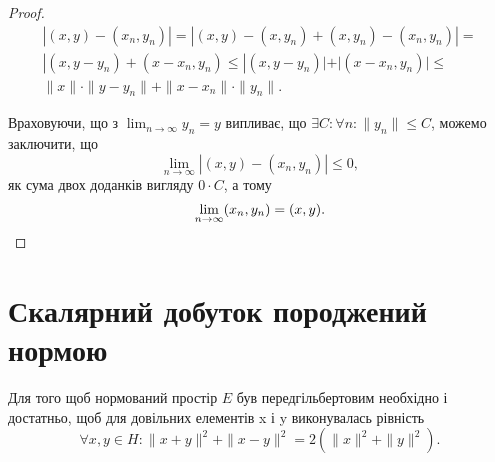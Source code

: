 \begin{proof}
\begin{multline*}
    |(x, y) - (x_n, y_n)| =
    |(x, y) - (x, y_n) + (x, y_n) - (x_n, y_n)| =  \\
    |(x, y - y_n) + (x - x_n, y_n) \le
    |(x, y - y_n)| + |(x - x_n, y_n)| \le \\
    \|x\| \cdot \|y - y_n\| + \|x - x_n\| \cdot \|y_n\|.
\end{multline*}

Враховуючи, що з $\lim_{n \to \infty} y_n = y$ випливає, що 
$\exists C: \forall n: \|y_n\| \le C$, можемо заключити, що
\begin{equation*}
    \lim_{n \to \infty}  |(x, y) - (x_n, y_n)| \le 0,
\end{equation*}
як сума двох доданків вигляду $0 \cdot C$, а тому
\begin{equation*}
    \lim_{n \to \infty} (x_n, y_n) = (x, y). \qedhere
\end{equation*}
\end{proof}

\section{Скалярний добуток породжений нормою}

\begin{proposition}
Для того щоб нормований простір $E$ був передгільбертовим
необхідно і достатньо, щоб для
довільних елементів x і y виконувалась рівність
\begin{equation}
    \label{eq:16.1}
    \forall x, y \in H: \|x + y\|^2 + \|x - y\|^2 = 2 (\|x\|^2 + \|y\|^2).
\end{equation}
\end{proposition}

